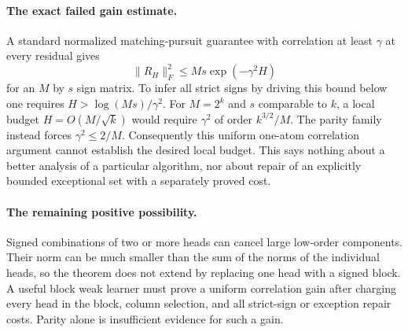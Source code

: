 \documentclass{article}
\begin{document}
\paragraph{The exact failed gain estimate.}
A standard normalized matching-pursuit guarantee with correlation at
least $\gamma$ at every residual gives
\[
 \|R_H\|_F^2\leq Ms\exp(-\gamma^2H)
\]
for an $M$ by $s$ sign matrix. To infer all strict signs by driving this
bound below one requires $H>\log(Ms)/\gamma^2$.
For $M=2^k$ and $s$ comparable to $k$, a local budget
$H=O(M/\sqrt{k})$ would require $\gamma^2$ of order
$k^{3/2}/M$. The parity family instead forces
$\gamma^2\leq2/M$. Consequently this uniform one-atom correlation
argument cannot establish the desired local budget. This says nothing
about a better analysis of a particular algorithm, nor about repair of
an explicitly bounded exceptional set with a separately proved cost.

\paragraph{The remaining positive possibility.}
Signed combinations of two or more heads can cancel large low-order
components. Their norm can be much smaller than the sum of the norms of
the individual heads, so the theorem does not extend by replacing one
head with a signed block. A useful block weak learner must prove a
uniform correlation gain after charging every head in the block,
column selection, and all strict-sign or exception repair costs.
Parity alone is insufficient evidence for such a gain.
\end{document}
